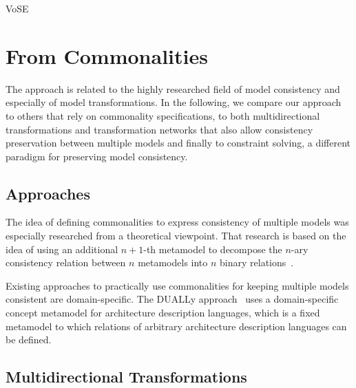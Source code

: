\begin{copiedFrom}{VoSE}

\section*{From Commonalities}

The \commonalities approach is related to the highly researched field of model consistency and especially of model 
transformations.
In the following, we compare our approach to others that rely on commonality specifications, to both multidirectional transformations and transformation networks that also allow consistency preservation between multiple models and finally to constraint solving, a different paradigm for preserving model consistency.

\subsection*{\commonality Approaches}

The idea of defining commonalities to express consistency of multiple models was especially researched from a theoretical viewpoint.
That research is based on the idea of using an additional $n+1$-th metamodel to decompose the $n$-ary consistency relation between $n$ metamodels into $n$ binary relations~\cite{stunkel2018MultimodelCorrespondence-ICPS, diskin2018MultiModelSynchronization-FASE}.

Existing approaches to practically use commonalities for keeping multiple models consistent are domain-specific. 
The DUALLy approach~\cite{malavolta2010ADLInteroperability-TSE, eramo2012Dually-SoSym} uses a domain-specific concept metamodel for architecture description languages, which is a fixed metamodel to which relations of arbitrary architecture description languages can be defined.


\subsection*{Multidirectional Transformations}


\end{copiedFrom}
